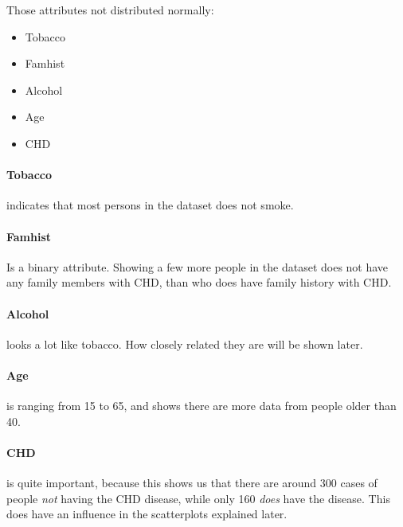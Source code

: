Those attributes not distributed normally:
\begin{itemize}
\item Tobacco
\item Famhist
\item Alcohol
\item Age
\item CHD
\end{itemize}

\paragraph{Tobacco} indicates that most persons in the dataset does not smoke.
\paragraph{Famhist} Is a binary attribute. Showing a few more people in the dataset does not have any family members with CHD, than who does have family history with CHD.
\paragraph{Alcohol} looks a lot like tobacco. How closely related they are will be shown later.
\paragraph{Age} is ranging from 15 to 65, and shows there are more data from people older than 40.
\paragraph{CHD} is quite important, because this shows us that there are around 300 cases of people \textit{not} having the CHD disease, while only 160 \textit{does} have the disease. This does have an influence in the scatterplots explained later.